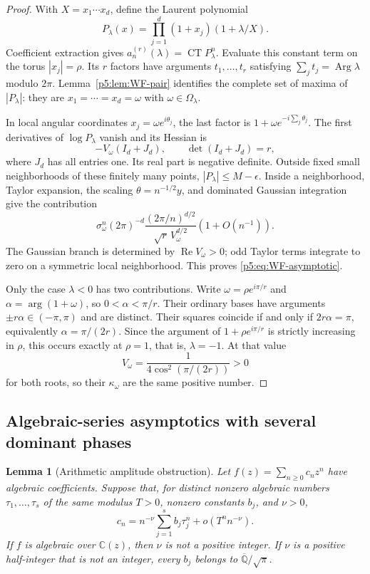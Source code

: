 \documentclass[11pt,a4paper]{article}
\newtheorem{lemma}[theorem]{Lemma}
\theoremstyle{definition}
\theoremstyle{remark}
\numberwithin{equation}{section}
\begin{document}
\begin{proof}
With $X=x_1\cdots x_d$, define the Laurent polynomial
\[
 P_\lambda(x)=\prod_{j=1}^d(1+x_j)(1+\lambda/X).
\]
Coefficient extraction gives $a_n^{(r)}(\lambda)=\operatorname{CT}
P_\lambda^n$. Evaluate this constant term on the torus
$|x_j|=\rho$. Its $r$ factors have arguments $t_1,\ldots,t_r$
satisfying $\sum_jt_j=\operatorname{Arg}\lambda$ modulo $2\pi$.
Lemma~\ref{p5:lem:WF-pair} identifies the complete set of maxima of
$|P_\lambda|$: they are $x_1=\cdots=x_d=\omega$ with
$\omega\in\Omega_\lambda$.

In local angular coordinates $x_j=\omega e^{i\theta_j}$, the last
factor is $1+\omega e^{-i\sum_j\theta_j}$. The first derivatives of
$\log P_\lambda$ vanish and its Hessian is
\[
 -V_\omega(I_d+J_d),\qquad \det(I_d+J_d)=r,
\]
where $J_d$ has all entries one. Its real part is negative definite.
Outside fixed small neighborhoods of these finitely many points,
$|P_\lambda|\le M-\epsilon$. Inside a neighborhood, Taylor expansion,
the scaling $\theta=n^{-1/2}y$, and dominated Gaussian integration
give the contribution
\[
 \sigma_\omega^n(2\pi)^{-d}
  \frac{(2\pi/n)^{d/2}}{\sqrt r\,V_\omega^{d/2}}
                         (1+O(n^{-1})).
\]
The Gaussian branch is determined by $\operatorname{Re}V_\omega>0$;
odd Taylor terms integrate to zero on a symmetric local neighborhood.
This proves \eqref{p5:eq:WF-asymptotic}.

Only the case $\lambda<0$ has two contributions. Write
$\omega=\rho e^{i\pi/r}$ and $\alpha=\arg(1+\omega)$, so
$0<\alpha<\pi/r$. Their ordinary bases have arguments
$\pm r\alpha\in(-\pi,\pi)$ and are distinct. Their squares coincide
if and only if $2r\alpha=\pi$, equivalently
$\alpha=\pi/(2r)$. Since the argument of $1+\rho e^{i\pi/r}$ is
strictly increasing in $\rho$, this occurs exactly at $\rho=1$,
that is, $\lambda=-1$. At that value
\[
 V_\omega=\frac{1}{4\cos^2(\pi/(2r))}>0
\]
for both roots, so their $\kappa_\omega$ are the same positive number.
\end{proof}

\subsection{Algebraic-series asymptotics with several dominant phases}

\begin{lemma}[Arithmetic amplitude obstruction]
\label{p5:lem:WF-obstruction}
Let $f(z)=\sum_{n\ge0}c_nz^n$ have algebraic coefficients. Suppose
that, for distinct nonzero algebraic numbers $\tau_1,\ldots,\tau_s$
of the same modulus $T>0$, nonzero constants $b_j$, and $\nu>0$,
\[
 c_n=n^{-\nu}\sum_{j=1}^sb_j\tau_j^n+o(T^n n^{-\nu}).
\]
If $f$ is algebraic over $\mathbb C(z)$, then $\nu$ is not a
positive integer. If $\nu$ is a positive half-integer that is not
an integer, every $b_j$ belongs to
$\overline{\mathbb Q}/\sqrt\pi$.
\end{lemma}
\end{document}
